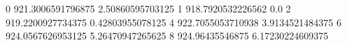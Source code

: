 0 921.3006591796875 2.50860595703125
1 918.7920532226562 0.0
2 919.2200927734375 0.42803955078125
4 922.7055053710938 3.9134521484375
6 924.0567626953125 5.26470947265625
8 924.96435546875 6.17230224609375
